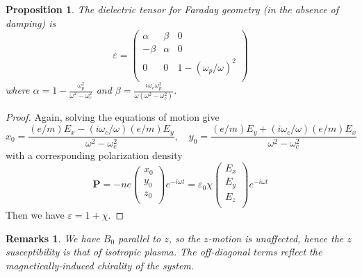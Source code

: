 \documentclass[a4paper]{article}
\newtheorem{remarks}{Remarks}[section]
\theoremstyle{new}
\newtheorem{prop}{Proposition}[section]
\begin{document}
\begin{prop}
The dielectric tensor for Faraday geometry (in the absence of damping) is
$$\varepsilon=\begin{pmatrix}\alpha&\beta&0\\-\beta&\alpha&0\\0&0&1-(\omega_p/\omega)^2\\\end{pmatrix}$$
where $\alpha=1-\frac{\omega_p^2}{\omega^2-\omega_c^2}$ and $\beta=\frac{i\omega_c\omega_p^2}{\omega(\omega^2-\omega_c^2)}$. 
\end{prop}
\begin{proof}
Again, solving the equations of motion give
$$x_0=\frac{(e/m)E_x-(i\omega_c/\omega)(e/m)E_y}{\omega^2-\omega_c^2},\quad y_0=\frac{(e/m)E_y+(i\omega_c/\omega)(e/m)E_x}{\omega^2-\omega_c^2}$$
with a corresponding polarization density
$$\mathbf{P}=-ne\begin{pmatrix}x_0\\y_0\\z_0\\\end{pmatrix}e^{-i\omega t}=\varepsilon_0\chi\begin{pmatrix}E_x\\E_y\\E_z\\\end{pmatrix}e^{-i\omega t}$$
Then we have $\varepsilon=1+\chi$.
\end{proof}
\begin{remarks}
We have $B_0$ parallel to $z$, so the $z$-motion is unaffected, hence the $z$ susceptibility is that of isotropic plasma. The off-diagonal terms reflect the magnetically-induced chirality of the system. 
\end{remarks}
\end{document}
